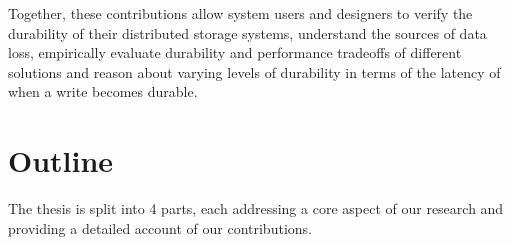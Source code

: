 \begin{enumerate}
\end{enumerate}

Together, these contributions allow system users and designers to verify the durability of their distributed storage systems, understand the sources of data loss, empirically evaluate durability and performance tradeoffs of different solutions and reason about varying levels of durability in terms of the latency of when a write becomes durable.

\section{Outline}
The thesis is split into 4 parts, each addressing a core aspect of our research and providing a detailed account of our contributions.

